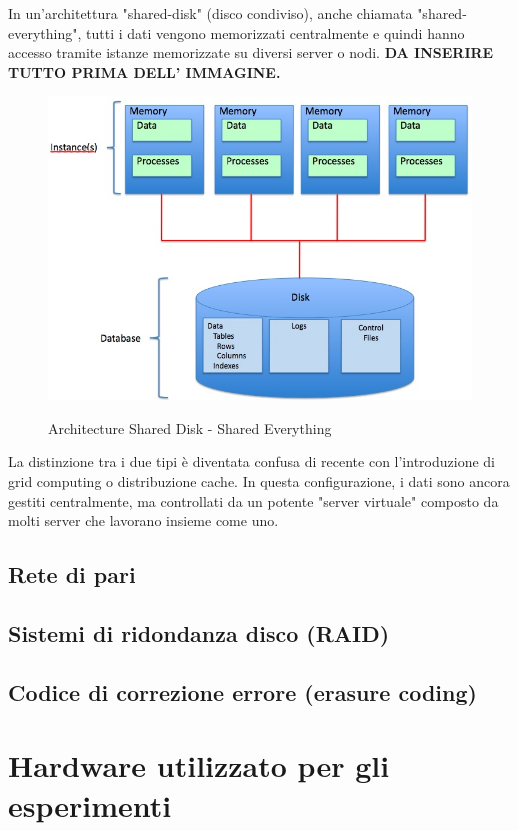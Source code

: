 In un'architettura "shared-disk" (disco condiviso), anche chiamata "shared-everything", tutti i dati vengono memorizzati centralmente e quindi hanno accesso tramite istanze memorizzate su diversi server o nodi.
\textbf{DA INSERIRE TUTTO PRIMA DELL' IMMAGINE.}
\begin{figure}[htbp]
\centering
\includegraphics[scale=0.40]{img/Shared_Disk_Architecture.jpg}\\
\caption{Architecture Shared Disk - Shared Everything \label{figura1.2} \cite{etichetta7}}
\end{figure}

La distinzione tra i due tipi \`{e} diventata confusa di recente con l'introduzione di grid computing o distribuzione cache. In questa configurazione, i dati sono ancora gestiti centralmente, ma controllati da un potente "server virtuale" composto da molti server che lavorano insieme come uno.\cite{etichetta2} 

\subsection{Rete di pari}
\subsection{Sistemi di ridondanza disco (RAID)}
\subsection{Codice di correzione errore (erasure coding)}
\section{Hardware utilizzato per gli esperimenti}
